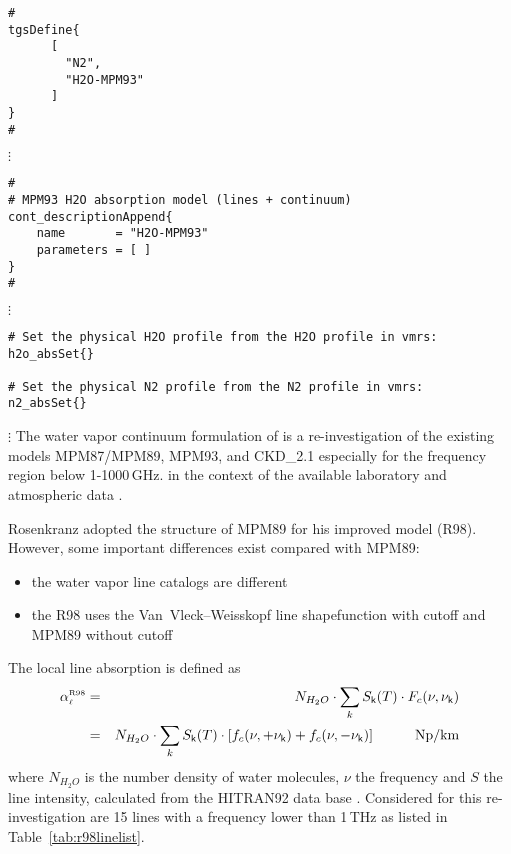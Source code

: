 
\begin{verbatim}
#
tgsDefine{
      [ 
        "N2",
        "H2O-MPM93"
      ] 
}
#
\end{verbatim}
$\vdots$
\begin{verbatim}
#
# MPM93 H2O absorption model (lines + continuum)
cont_descriptionAppend{
    name       = "H2O-MPM93"
    parameters = [ ]
}
#
\end{verbatim}
$\vdots$
\begin{verbatim}
# Set the physical H2O profile from the H2O profile in vmrs:
h2o_absSet{}

# Set the physical N2 profile from the N2 profile in vmrs:
n2_absSet{}
\end{verbatim}
$\vdots$
%
%
%
% 
\label{leveld:pwr98}
The water vapor continuum formulation of \citet{pwr:98} is a re-investigation 
of the existing models MPM87/MPM89, MPM93, and CKD\_2.1 especially for 
the frequency region below 1-1000\,GHz. in the context of the available
laboratory and atmospheric data \citep{abaueretal:89, abaueretal:93, 
abaueretal:95, beckerautler:46, englishetal:94, godonetal:92,
liebe:84, liebeandlayton:87, westwateretal:90}.

Rosenkranz adopted the structure of MPM89 for his improved model (R98). 
However, some important differences exist compared with MPM89:
\begin{itemize}
\item the water vapor line catalogs are different 
\item the R98 uses the Van~Vleck--Weisskopf line shapefunction with 
      cutoff and MPM89 without cutoff
\end{itemize}

\label{levele:pwr98_line}
The local line absorption is defined as 
\begin{eqnarray} 
 \label{eq:r98absline}
 \alphapwrl &=& N_{H_2O} \cdot \sum_k \inten \cdot \shapec \nonumber\\
            &=& N_{H_2O} \cdot \sum_k \inten \cdot 
                \left [\shapefp + \shapefm \right]\hspace*{10mm}\mbox{Np/km}
\end{eqnarray}
where $N_{H_2O}$ is the number density of water molecules, $\nu$ the
frequency and $S$ the line intensity, calculated from the HITRAN92
data base \citet{rothman:92}. Considered for this re-investigation are 
15 lines with a frequency lower than 1\,THz as listed in 
Table~\ref{tab:r98linelist}.

